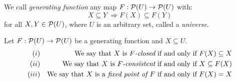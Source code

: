 
\begin{defin}\label{logic:def:generating:function}
  We call {\em generating function} any map 
  $F:{\cal P}(U)\rightarrow{\cal P}(U)$ with:
  \[
    X\subseteq Y\ \Rightarrow F(X)\subseteq F(Y)
  \]
for all $X,Y\in{\cal P}(U)$, where $U$ is an arbitrary set,
called a {\em universe}.
\end{defin}

\begin{defin}\label{logic:def:genfun:closed:consistent}
  Let $F:{\cal P}(U)\rightarrow{\cal P}(U)$ be a generating function and 
  $X\subseteq U$.
  \begin{eqnarray*}
    (i)&&\mbox{We say that $X$ is {\em $F$-closed} \ifand\ $F(X)\subseteq X$}\\
    (ii)&&\mbox{We say that $X$ is {\em $F$-consistent} \ifand\ 
    $X\subseteq F(X)$}\\
    (iii)&&\mbox{We say that $X$ is a {\em fixed point of $F$} \ifand\ 
    $F(X)=X$}
  \end{eqnarray*}
\end{defin}
